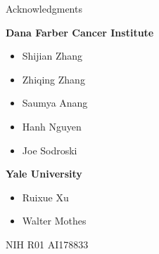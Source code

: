 \begin{frame}[fragile]{Acknowledgments}
    \begin{center}
        \begin{minipage}[t][.6\textheight]{0.45\textwidth}
            \textcolor{DUred}{\bf Dana Farber Cancer Institute}
            \begin{itemize}
                \item[] Shijian Zhang
                \item[] Zhiqing Zhang
                \item[] Saumya Anang
                \item[] Hanh Nguyen
                \item[] Joe Sodroski
            \end{itemize}
        \end{minipage}\hfill
        \begin{minipage}[t][.6\textheight]{0.45\textwidth}
            \textcolor{DUred}{\bf Yale University}
            \begin{itemize}
                \item[] Ruixue Xu
                \item[] Walter Mothes
            \end{itemize}
        \end{minipage}

        \color{DUgreen!90!black}{\bf Funding:} NIH R01 AI178833
    \end{center}
\end{frame}

